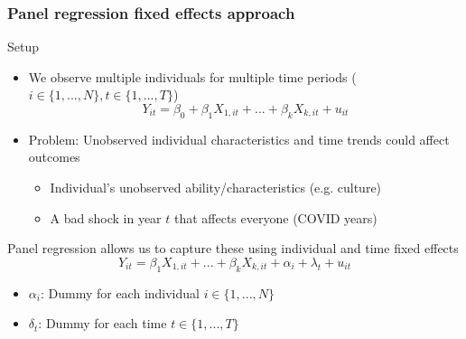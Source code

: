 \documentclass[aspectratio=169]{beamer}
\begin{document}
\begin{frame}
\frametitle{Panel regression fixed effects approach} 
Setup
\begin{itemize}\setlength\itemsep{3pt}
\item We observe multiple individuals for multiple time periods ($i\in \{1,...,N\}, t\in \{1,...,T\}$)
\[
Y_{it} = \beta_0 + \beta_1X_{1,it}+ ... +\beta_kX_{k,it}+u_{it}
\]
\item Problem: Unobserved individual characteristics and time trends could affect outcomes \smallskip
\begin{itemize}\setlength\itemsep{3pt}
\item Individual's unobserved ability/characteristics (e.g. culture)
\item A bad shock in year $t$ that affects everyone (COVID years)
\end{itemize}
\end{itemize}\medskip
 Panel regression allows us to capture these using individual and time fixed effects
\[
Y_{it}=\beta_1 X_{1,it}+...+\beta_k X_{k,it} + \alpha_i +\lambda_t + u_{it}
\] \vspace{-15pt}
\begin{itemize}\setlength\itemsep{3pt}
\item $\alpha_i$: Dummy for each individual $i\in\{1,...,N\}$
\item $\delta_t$: Dummy for each time $t\in\{1,...,T\}$
\end{itemize}
\end{frame}
\end{document}
